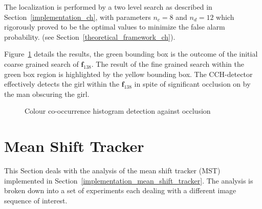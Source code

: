 The localization is performed by a two level search as described in
Section~\ref{implementation_ch}, with parameters $n_c=8$ and $n_d=12$ which
\cite{Chang1999} rigorously proved to be the optimal values to minimize the false
alarm probability. (see Section~\ref{theoretical_framework_ch}).

Figure~\ref{fig:ch_partial_occlusion} details the results, the green bounding
box is the outcome of the initial coarse grained search of $\mathbf{f}_{138}$.
The result of the fine grained search within the green box region is highlighted
by the yellow bounding box. 
The CCH-detector effectively detects the girl within the $\mathbf{f}_{138}$ in
spite of significant occlusion on by the man obscuring the girl. 

\begin{figure}     
    \caption{Colour co-occurrence histogram detection against occlusion\label{fig:ch_partial_occlusion}
    }
\end{figure}


\section{Mean Shift Tracker}
This Section deals with the analysis of the mean shift tracker (MST)
implemented in Section~\ref{implementation_mean_shift_tracker}. The analysis is
broken down into a set of experiments each dealing with a different image
sequence of interest.

